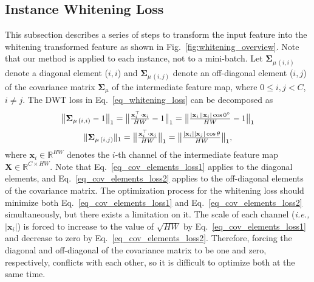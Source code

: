 \documentclass[final]{latex/cvpr}
\begin{document}
\subsection{Instance Whitening Loss}\label{method:deep_instance_whitening}
\vspace{-0.1cm}
This subsection describes a series of steps to transform the input feature into the whitening transformed feature as shown in Fig.~\ref{fig:whitening_overview}. Note that our method is applied to each instance, not to a mini-batch.
Let $\mathbf{\Sigma}_{\mu\,(i,i)}$ denote a diagonal element ($i,i$) and $\mathbf{\Sigma}_{\mu\,(i,j)}$ denote an off-diagonal element ($i,j$) of the covariance matrix $\mathbf{\Sigma}_{\mu}$ of the intermediate feature map, where $0\le i,j<C$, $i\ne j$.
The DWT loss in Eq.~\eqref{eq_whitening_loss} 
can be decomposed as
\vspace{-0.05cm}
\begin{equation}\label{eq_cov_elements_loss1}
{\big\Vert}\mathbf{\Sigma}_{\mu\,(i,i)}-1{\big\Vert}_1={\big\Vert}\tfrac{\mathbf{x}_{i}^\top\cdot\mathbf{x}_{i}}{HW}-1{\big\Vert}_1={\big\Vert}\tfrac{\vert\mathbf{x}_{i}\vert\vert\mathbf{x}_{i}\vert\cos\text{0}^{\circ}}{HW}-1{\big\Vert}_1
\vspace{-0.05cm}
\end{equation}
\begin{equation}\label{eq_cov_elements_loss2}
\Vert\mathbf{\Sigma}_{\mu\,(i,j)}\Vert_1={\big\Vert}\tfrac{\mathbf{x}_{i}^\top\cdot\mathbf{x}_{j}}{HW}{\big\Vert}_1={\big\Vert}\tfrac{\vert\mathbf{x}_{i}\vert\vert\mathbf{x}_{j}\vert\cos\theta}{HW}{\big\Vert}_{1},
\vspace{0.05cm}
\end{equation}
where $\mathbf{x}_{i}\in\mathbb{R}^{HW}$ denotes the $i$-th channel of the intermediate feature map $\mathbf{X}\in\mathbb{R}^{C\times HW}$. 
Note that Eq.~\eqref{eq_cov_elements_loss1} applies to the diagonal elements, and Eq.~\eqref{eq_cov_elements_loss2} applies to the off-diagonal elements of the covariance matrix.
The optimization process for the whitening loss should minimize both Eq.~\eqref{eq_cov_elements_loss1} and Eq.~\eqref{eq_cov_elements_loss2} simultaneously, but there exists a limitation on it.
The scale of each channel (\textit{i.e.,} $\vert\mathbf{x}_{i}\vert$) is forced to increase to the value of $\sqrt{HW}$ by Eq.~\eqref{eq_cov_elements_loss1} and decrease to zero by Eq.~\eqref{eq_cov_elements_loss2}. 
Therefore, forcing the diagonal and off-diagonal of the covariance matrix to be one and zero, respectively, conflicts with each other, so it is difficult to optimize both at the same time.
\end{document}
